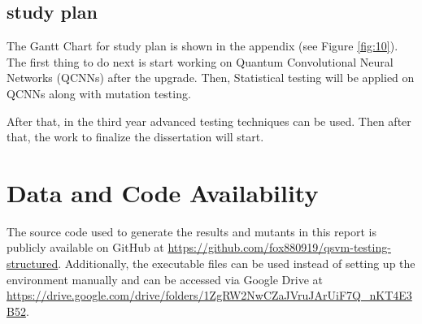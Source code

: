 \documentclass[12pt,a4paper]{article}
\begin{document}
	\subsection{study plan}
	
	The Gantt Chart for study plan is shown in the appendix (see Figure \ref{fig:10}). The first thing to do next is start working on Quantum Convolutional Neural Networks (QCNNs) after the upgrade. Then, Statistical testing will be applied on QCNNs along with mutation testing. 
	
	After that, in the third year advanced testing techniques can be used. Then after that, the work to finalize the dissertation will start.
	

	

	
	\section*{Data and Code Availability}
	The source code used to generate the results and mutants in this report is publicly available on GitHub at \url{https://github.com/fox880919/qsvm-testing-structured}. Additionally, the executable files can be used instead of setting up the environment manually and can be accessed via Google Drive at \url{https://drive.google.com/drive/folders/1ZgRW2NwCZaJVruJArUiF7Q_nKT4E3B52}.
	
	
		
	
	\clearpage 
	
\end{document}
